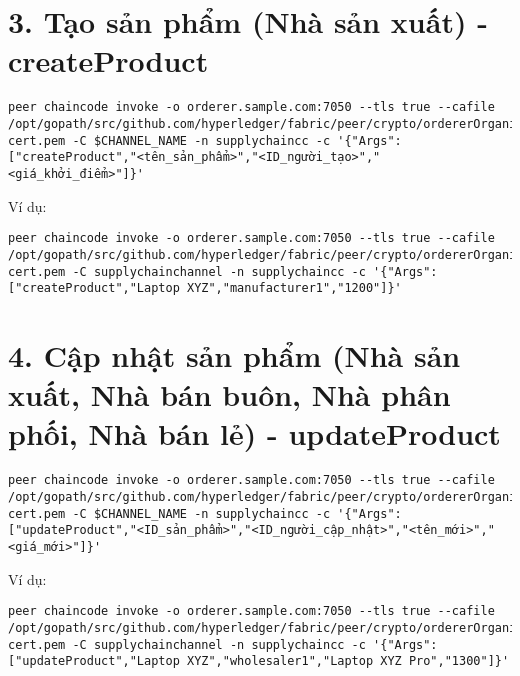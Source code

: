 \documentclass{article}
\begin{document}
\section{3. Tạo sản phẩm (Nhà sản xuất) - createProduct}

\begin{lstlisting}[breaklines=true]
peer chaincode invoke -o orderer.sample.com:7050 --tls true --cafile /opt/gopath/src/github.com/hyperledger/fabric/peer/crypto/ordererOrganizations/sample.com/orderers/orderer.sample.com/msp/tlscacerts/tlsca.sample.com-cert.pem -C $CHANNEL_NAME -n supplychaincc -c '{"Args":["createProduct","<tên_sản_phẩm>","<ID_người_tạo>","<giá_khởi_điểm>"]}'
\end{lstlisting}

Ví dụ:

\begin{lstlisting}[breaklines=true]
peer chaincode invoke -o orderer.sample.com:7050 --tls true --cafile /opt/gopath/src/github.com/hyperledger/fabric/peer/crypto/ordererOrganizations/sample.com/orderers/orderer.sample.com/msp/tlscacerts/tlsca.sample.com-cert.pem -C supplychainchannel -n supplychaincc -c '{"Args":["createProduct","Laptop XYZ","manufacturer1","1200"]}'
\end{lstlisting}

\section{4. Cập nhật sản phẩm (Nhà sản xuất, Nhà bán buôn, Nhà phân phối, Nhà bán lẻ) - updateProduct}

\begin{lstlisting}[breaklines=true]
peer chaincode invoke -o orderer.sample.com:7050 --tls true --cafile /opt/gopath/src/github.com/hyperledger/fabric/peer/crypto/ordererOrganizations/sample.com/orderers/orderer.sample.com/msp/tlscacerts/tlsca.sample.com-cert.pem -C $CHANNEL_NAME -n supplychaincc -c '{"Args":["updateProduct","<ID_sản_phẩm>","<ID_người_cập_nhật>","<tên_mới>","<giá_mới>"]}'
\end{lstlisting}

Ví dụ:

\begin{lstlisting}[breaklines=true]
peer chaincode invoke -o orderer.sample.com:7050 --tls true --cafile /opt/gopath/src/github.com/hyperledger/fabric/peer/crypto/ordererOrganizations/sample.com/orderers/orderer.sample.com/msp/tlscacerts/tlsca.sample.com-cert.pem -C supplychainchannel -n supplychaincc -c '{"Args":["updateProduct","Laptop XYZ","wholesaler1","Laptop XYZ Pro","1300"]}'
\end{lstlisting}
\end{document}
